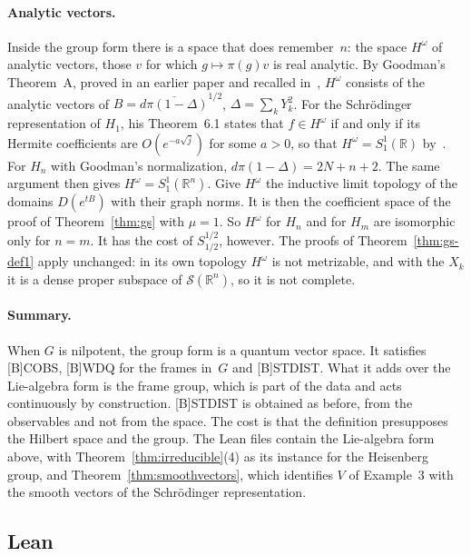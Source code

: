 \documentclass[11pt]{article}
\theoremstyle{definition}
\begin{document}
\paragraph{Analytic vectors.} Inside the group form there is a space that does remember~$n$: the
space $H^\omega$ of analytic vectors, those $v$ for which $g \mapsto \pi(g)v$ is real analytic. By
Goodman's Theorem~A, proved in an earlier paper and recalled in~\cite[Introduction]{goodman}, $H^\omega$ consists of the analytic vectors of
$B = \overline{d\pi(1 - \Delta)}^{1/2}$, $\Delta = \sum_k Y_k^2$. For the Schr\"odinger
representation of $H_1$, his Theorem~6.1 states that $f \in H^\omega$ if and only if its Hermite
coefficients are $O(e^{-a\sqrt j})$ for some $a > 0$, so that $H^\omega = S^1_1(\mathbb R)$
by~\cite[Thm.~1.2]{gpr}. For $H_n$ with Goodman's normalization, $d\pi(1 - \Delta) = 2N + n + 2$.
The same argument then gives $H^\omega = S^1_1(\mathbb R^n)$. Give $H^\omega$ the inductive limit
topology of the domains $D(e^{tB})$ with their graph norms. It is then the coefficient space of the
proof of Theorem~\ref{thm:gs} with $\mu = 1$. So $H^\omega$ for $H_n$ and for $H_m$ are isomorphic
only for $n = m$. It has the cost of $S^{1/2}_{1/2}$, however. The proofs of
Theorem~\ref{thm:gs-def1} apply unchanged: in its own topology $H^\omega$ is not metrizable, and
with the $X_k$ it is a dense proper subspace of $\mathcal S(\mathbb R^n)$, so it is not complete.

\paragraph{Summary.} When $G$ is nilpotent, the group form is a quantum vector space. It satisfies
[B]COBS, [B]WDQ for the frames in~$G$ and [B]STDIST. What it adds over the Lie-algebra form is the
frame group, which is part of the data and acts continuously by construction. [B]STDIST is
obtained as before, from the observables and not from the space. The cost is that the definition
presupposes the Hilbert space and the group. The Lean files contain the Lie-algebra form above,
with Theorem~\ref{thm:irreducible}(4) as its instance for the Heisenberg group, and
Theorem~\ref{thm:smoothvectors}, which identifies $V$ of Example~3 with the smooth vectors of the
Schr\"odinger representation.

\subsection{Lean}
\end{document}

